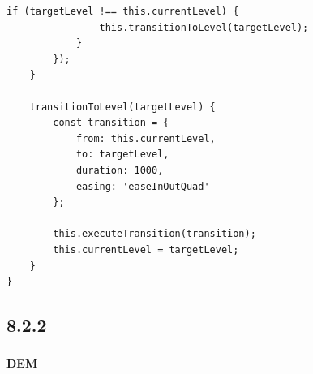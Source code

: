\begin{lstlisting}[style=javascript]
            if (targetLevel !== this.currentLevel) {
                this.transitionToLevel(targetLevel);
            }
        });
    }
    
    transitionToLevel(targetLevel) {
        const transition = {
            from: this.currentLevel,
            to: targetLevel,
            duration: 1000,
            easing: 'easeInOutQuad'
        };
        
        this.executeTransition(transition);
        this.currentLevel = targetLevel;
    }
}
\end{lstlisting}

\hypertarget{section-72}{%
\subsection{8.2.2}\label{section-72}}

\hypertarget{section-73}{%
\subsubsection{}\label{section-73}}

\hypertarget{dem}{%
\paragraph{DEM}\label{dem}}

